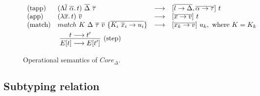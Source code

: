 \documentclass[11pt]{article}
\newcommand{\ap}{~}
\begin{document}
    \begin{figure}
        \begin{gather*}
            \begin{array}{llll}
                \text{(tapp)} & (\Lambda \overline{l}~\overline{\alpha}\ldotp t)\ap \overline{\Delta} \ap \overline{\tau} & \longrightarrow & [\overline{l \to \Delta}, \overline{\alpha\to\tau}]\ap t
                \\
                \text{(app)} & (\lambda \overline{x}\ldotp t) \ap \overline{v} & \longrightarrow & [\overline{x\to v}]\ap t
                \\
                \text{(match)} & match ~K \ap\Delta\ap\overline{\tau}\ap \overline{v} ~ \{ \overline{K_i \ap \overline{x}_i \to u_i}\} & \longrightarrow & [\overline{x_k\to v}]\ap u_k, \text{ where } K = K_k
            \end{array}\\
            \hspace{-15em}\infer[\text{(step)}]{E[t]\longrightarrow E[t']}{t\longrightarrow t'}
        \end{gather*}
        \caption{Operational semantics of $Core_\Delta$.}
        \label{fig:core-operational}
    \end{figure}

    \subsection{Subtyping relation}
\end{document}
